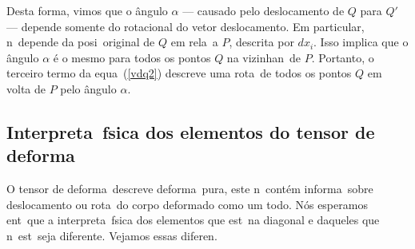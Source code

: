 Desta forma, vimos que o \^angulo $\alpha$ --- causado pelo deslocamento de $Q$
para $Q'$ --- depende somente do rotacional do vetor deslocamento. Em
particular, n\ao\ depende da posi\cao\ original de $Q$ em rela\cao\ a
$P$, descrita por $dx_i$. Isso implica que o \^angulo $\alpha$ \'e o
mesmo para todos os pontos $Q$ na vizinhan\ca\ de $P$.
Portanto, o terceiro termo da equa\cao\ (\ref{vdq2}) descreve
uma rota\cao\ de todos os pontos $Q$ em volta de $P$ pelo \^angulo
$\alpha$.

\subsection{Interpreta\cao\ f\ih sica dos elementos do %
tensor de deforma\cao}

O tensor de deforma\cao\ descreve deforma\cao\ pura, este
n\ao\ cont\'em informa\cao\ sobre deslocamento ou
rota\cao\ do corpo deformado como um todo. N\'os esperamos
ent\ao\ que a interpreta\cao\ f\ih sica dos elementos que
est\ao\ na diagonal e daqueles que n\ao\ est\ao\ seja
diferente. Vejamos essas diferen\cas.

